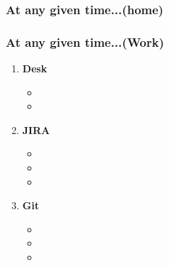 \begin{frame}
\frametitle{At any given time...(home)}

\end{frame}

\begin{frame}
\frametitle{At any given time...(Work)}
\begin{enumerate}
\item \small \textbf{Desk}
\begin{itemize}
\item \tiny
\item \tiny
\end{itemize}
\item \small \textbf{JIRA}
\begin{itemize}
\item \tiny
\item \tiny
\item \tiny
\end{itemize}
\item \small \textbf{Git}
\begin{itemize}
\item \tiny
\item \tiny
\item \tiny
\end{itemize}
\end{enumerate}
\end{frame}


